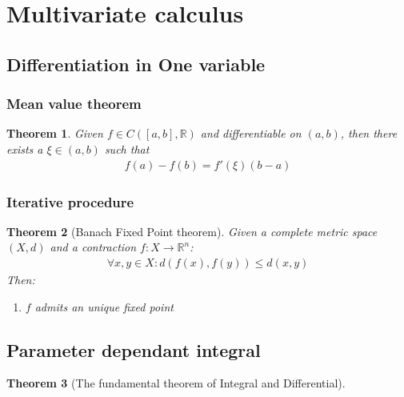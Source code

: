\documentclass[12pt,fleqn]{book}
\newtheorem{theorem}{Theorem}[section]
\theoremstyle{definition}
\begin{document}
\section{Multivariate calculus}
\subsection{Differentiation in One variable}
\subsubsection{Mean value theorem}
\begin{theorem}
	Given $f \in C([a, b], \mathbb{R})$ and differentiable on $(a, b)$, then there exists a $\xi \in (a, b)$ such that
	\begin{align*}
		f(a) - f(b) = f'(\xi) (b - a)
	\end{align*}
\end{theorem}



\subsubsection{Iterative procedure}
\begin{theorem}[Banach Fixed Point theorem]
	Given a complete metric space $(X, d)$ and a contraction $f:X \rightarrow \mathbb{R}^n $:
	\begin{align*}
		\forall x, y \in X: d(f(x), f(y)) \leq d(x, y)
	\end{align*}
	Then:
	\begin{enumerate}
		\item $f$ admits an unique fixed point
	\end{enumerate}
\end{theorem}
\subsection{Parameter dependant integral}
\begin{theorem}[The fundamental theorem of Integral and Differential]
\end{theorem}
\end{document}
